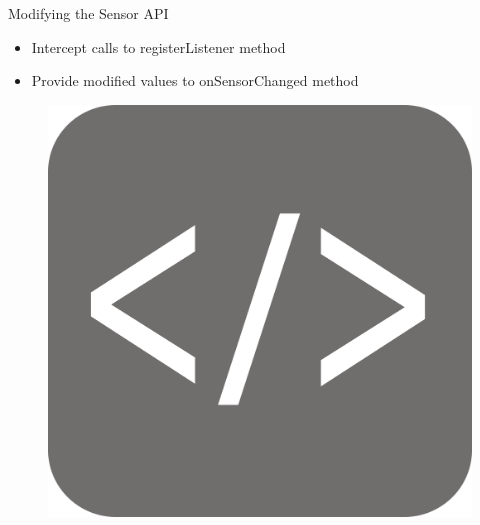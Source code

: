 \documentclass[aspectratio=169]{beamer}
[aspectratio=169] %
\begin{document}
\begin{frame}{Modifying the Sensor API}
  \begin{minipage}{0.49\textwidth} 
    \begin{itemize}
      \item Intercept calls to registerListener method
      \item Provide modified values to onSensorChanged method
    \end{itemize}
  \end{minipage}
  \hfill
  \begin{minipage}{0.49\textwidth} 
    \begin{figure}
      \centering
      \includegraphics[height=0.5\textheight]{figures/code.png}
    \end{figure}
  \end{minipage}
\end{frame}
\end{document}
